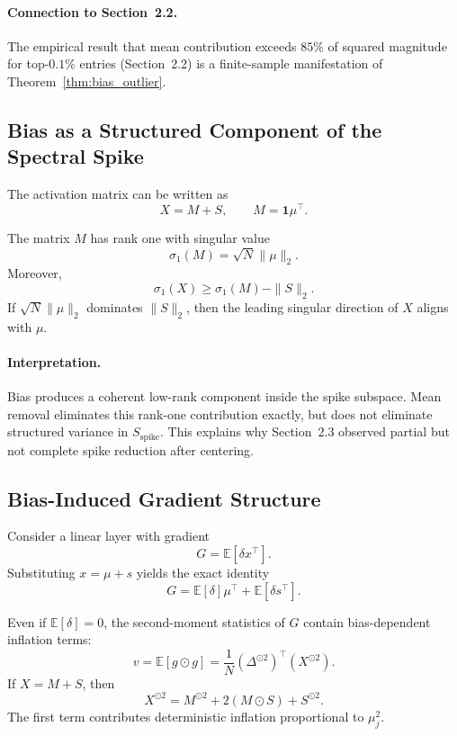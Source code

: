 \paragraph{Connection to Section~2.2.}
The empirical result that mean contribution exceeds $85\%$ of squared magnitude
for top-$0.1\%$ entries (Section~2.2) is a finite-sample manifestation of
Theorem~\ref{thm:bias_outlier}.

\subsection{Bias as a Structured Component of the Spectral Spike}
\label{subsec:theory_spike}

The activation matrix can be written as
\[
X = M + S,
\qquad
M = \mathbf{1}\mu^\top.
\]

\begin{theorem}
\label{thm:bias_spike}
The matrix $M$ has rank one with singular value
\[
\sigma_1(M) = \sqrt{N}\|\mu\|_2.
\]
Moreover,
\[
\sigma_1(X) \ge \sigma_1(M) - \|S\|_2.
\]
If $\sqrt{N}\|\mu\|_2$ dominates $\|S\|_2$,
then the leading singular direction of $X$ aligns with $\mu$.
\end{theorem}

\paragraph{Interpretation.}
Bias produces a coherent low-rank component inside the spike subspace.
Mean removal eliminates this rank-one contribution exactly, but does not
eliminate structured variance in $S_{\text{spike}}$.
This explains why Section~2.3 observed partial but not complete spike reduction
after centering.

\subsection{Bias-Induced Gradient Structure}
\label{subsec:theory_grad}

Consider a linear layer with gradient
\[
G = \mathbb{E}[\delta x^\top].
\]
Substituting $x = \mu + s$ yields the exact identity
\begin{equation}
\label{eq:G_decomp_theory}
G =
\mathbb{E}[\delta]\mu^\top
+
\mathbb{E}[\delta s^\top].
\end{equation}

\begin{theorem}
\label{thm:grad_bias}
Even if $\mathbb{E}[\delta]=0$, the second-moment statistics of $G$
contain bias-dependent inflation terms:
\[
v = \mathbb{E}[g \odot g]
= \frac{1}{N}(\Delta^{\odot 2})^\top (X^{\odot 2}).
\]
If $X = M + S$, then
\[
X^{\odot 2}
=
M^{\odot 2}
+
2(M \odot S)
+
S^{\odot 2}.
\]
The first term contributes deterministic inflation proportional to $\mu_j^2$.
\end{theorem}

